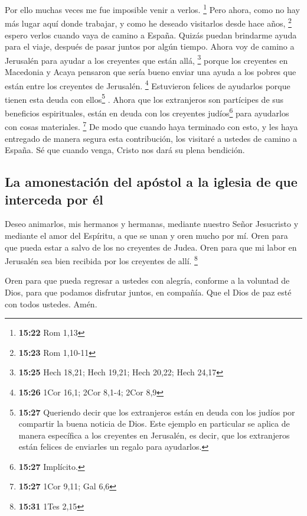  Por ello muchas veces me fue imposible venir a verlos.
\footnote{\textbf{15:22} Rom 1,13}  Pero ahora, como no
hay más lugar aquí donde trabajar, y como he deseado visitarlos desde
hace años, \footnote{\textbf{15:23} Rom 1,10-11}  espero
verlos cuando vaya de camino a España. Quizás puedan brindarme ayuda
para el viaje, después de pasar juntos por algún tiempo. 
Ahora voy de camino a Jerusalén para ayudar a los creyentes que están
allá, \footnote{\textbf{15:25} Hech 18,21; Hech 19,21; Hech 20,22; Hech
  24,17}  porque los creyentes en Macedonia y Acaya
pensaron que sería bueno enviar una ayuda a los pobres que están entre
los creyentes de Jerusalén. \footnote{\textbf{15:26} 1Cor 16,1; 2Cor
  8,1-4; 2Cor 8,9}  Estuvieron felices de ayudarlos
porque tienen esta deuda con ellos\footnote{\textbf{15:27} Queriendo
  decir que los extranjeros están en deuda con los judíos por compartir
  la buena noticia de Dios. Este ejemplo en particular se aplica de
  manera específica a los creyentes en Jerusalén, es decir, que los
  extranjeros están felices de enviarles un regalo para ayudarlos.} .
Ahora que los extranjeros son partícipes de sus beneficios espirituales,
están en deuda con los creyentes judíos\footnote{\textbf{15:27}
  Implícito.} para ayudarlos con cosas materiales. \footnote{\textbf{15:27}
  1Cor 9,11; Gal 6,6}  De modo que cuando haya terminado
con esto, y les haya entregado de manera segura esta contribución, los
visitaré a ustedes de camino a España.  Sé que cuando
venga, Cristo nos dará su plena bendición.

\hypertarget{la-amonestaciuxf3n-del-apuxf3stol-a-la-iglesia-de-que-interceda-por-uxe9l}{%
\subsection{La amonestación del apóstol a la iglesia de que interceda
por
él}\label{la-amonestaciuxf3n-del-apuxf3stol-a-la-iglesia-de-que-interceda-por-uxe9l}}

 Deseo animarlos, mis hermanos y hermanas, mediante
nuestro Señor Jesucristo y mediante el amor del Espíritu, a que se unan
y oren mucho por mí.  Oren para que pueda estar a salvo
de los no creyentes de Judea. Oren para que mi labor en Jerusalén sea
bien recibida por los creyentes de allí. \footnote{\textbf{15:31} 1Tes
  2,15}

 Oren para que pueda regresar a ustedes con alegría,
conforme a la voluntad de Dios, para que podamos disfrutar juntos, en
compañía.  Que el Dios de paz esté con todos ustedes.
Amén.

